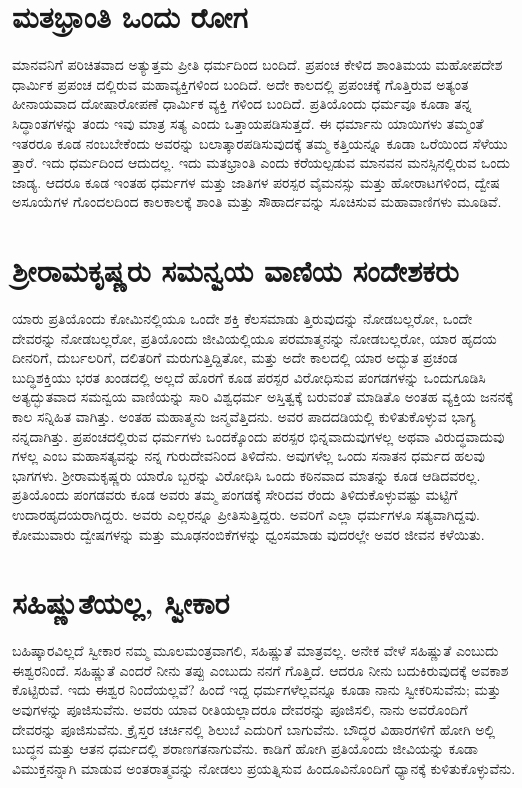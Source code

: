 \section{ಮತಭ್ರಾಂತಿ ಒಂದು ರೋಗ}

ಮಾನವನಿಗೆ ಪರಿಚಿತವಾದ ಅತ್ಯುತ್ತಮ ಪ್ರೀತಿ ಧರ್ಮದಿಂದ ಬಂದಿದೆ. ಪ್ರಪಂಚ ಕೇಳಿದ ಶಾಂತಿಮಯ ಮಹೋಪದೇಶ ಧಾರ್ಮಿಕ ಪ್ರಪಂಚ ದಲ್ಲಿರುವ ಮಹಾವ್ಯಕ್ತಿಗಳಿಂದ ಬಂದಿದೆ. ಅದೇ ಕಾಲದಲ್ಲಿ ಪ್ರಪಂಚಕ್ಕೆ ಗೊತ್ತಿರುವ ಅತ್ಯಂತ ಹೀನಾಯವಾದ ದೋಷಾರೋಪಣೆ ಧಾರ್ಮಿಕ ವ್ಯಕ್ತಿ ಗಳಿಂದ ಬಂದಿದೆ. ಪ್ರತಿಯೊಂದು ಧರ್ಮವೂ ಕೂಡಾ ತನ್ನ ಸಿದ್ಧಾಂತಗಳನ್ನು ತಂದು ಇವು ಮಾತ್ರ ಸತ್ಯ ಎಂದು ಒತ್ತಾಯಪಡಿಸುತ್ತದೆ. ಈ ಧರ್ಮಾನು ಯಾಯಿಗಳು ತಮ್ಮಂತೆ ಇತರರೂ ಕೂಡ ನಂಬಬೇಕೆಂದು ಅವರನ್ನು ಬಲಾತ್ಕಾರಪಡಿಸುವುದಕ್ಕೆ ತಮ್ಮ ಕತ್ತಿಯನ್ನೂ ಕೂಡಾ ಒರೆಯಿಂದ ಸೆಳೆಯು ತ್ತಾರೆ. ಇದು ಧರ್ಮದಿಂದ ಆದುದಲ್ಲ. ಇದು ಮತಭ್ರಾಂತಿ ಎಂದು ಕರೆಯಲ್ಪಡುವ ಮಾನವನ ಮನಸ್ಸಿನಲ್ಲಿರುವ ಒಂದು ಜಾಡ್ಯ. ಆದರೂ ಕೂಡ ಇಂತಹ ಧರ್ಮಗಳ ಮತ್ತು ಜಾತಿಗಳ ಪರಸ್ಪರ ವೈಮನಸ್ಸು ಮತ್ತು ಹೋರಾಟಗಳಿಂದ, ದ್ವೇಷ ಅಸೂಯೆಗಳ ಗೊಂದಲದಿಂದ ಕಾಲಕಾಲಕ್ಕೆ ಶಾಂತಿ ಮತ್ತು ಸೌಹಾರ್ದವನ್ನು ಸೂಚಿಸುವ ಮಹಾವಾಣಿಗಳು ಮೂಡಿವೆ.


\section{ಶ್ರೀರಾಮಕೃಷ್ಣರು ಸಮನ್ವಯ ವಾಣಿಯ ಸಂದೇಶಕರು}

ಯಾರು ಪ್ರತಿಯೊಂದು ಕೋಮಿನಲ್ಲಿಯೂ ಒಂದೇ ಶಕ್ತಿ ಕೆಲಸಮಾಡು ತ್ತಿರುವುದನ್ನು ನೋಡಬಲ್ಲರೋ, ಒಂದೇ ದೇವರನ್ನು ನೋಡಬಲ್ಲರೋ, ಪ್ರತಿಯೊಂದು ಜೀವಿಯಲ್ಲಿಯೂ ಪರಮಾತ್ಮನನ್ನು ನೋಡಬಲ್ಲರೋ, ಯಾರ ಹೃದಯ ದೀನರಿಗೆ, ದುರ್ಬಲರಿಗೆ, ದಲಿತರಿಗೆ ಮರುಗುತ್ತಿದ್ದಿತೋ, ಮತ್ತು ಅದೇ ಕಾಲದಲ್ಲಿ ಯಾರ ಅದ್ಭುತ ಪ್ರಚಂಡ ಬುದ್ಧಿಶಕ್ತಿಯು ಭರತ ಖಂಡದಲ್ಲಿ ಅಲ್ಲದೆ ಹೊರಗೆ ಕೂಡ ಪರಸ್ಪರ ವಿರೋಧಿಸುವ ಪಂಗಡಗಳನ್ನು ಒಂದುಗೂಡಿಸಿ ಅತ್ಯದ್ಭುತವಾದ ಸಮನ್ವಯ ವಾಣಿಯನ್ನು ಸಾರಿ ವಿಶ್ವಧರ್ಮ ಅಸ್ತಿತ್ವಕ್ಕೆ ಬರುವಂತೆ ಮಾಡಿತೊ ಅಂತಹ ವ್ಯಕ್ತಿಯ ಜನನಕ್ಕೆ ಕಾಲ ಸನ್ನಿಹಿತ ವಾಗಿತ್ತು. ಅಂತಹ ಮಹಾತ್ಮನು ಜನ್ಮವೆತ್ತಿದನು. ಅವರ ಪಾದದಡಿಯಲ್ಲಿ ಕುಳಿತುಕೊಳ್ಳುವ ಭಾಗ್ಯ ನನ್ನದಾಗಿತ್ತು. ಪ್ರಪಂಚದಲ್ಲಿರುವ ಧರ್ಮಗಳು ಒಂದಕ್ಕೊಂದು ಪರಸ್ಪರ ಭಿನ್ನವಾದುವುಗಳಲ್ಲ ಅಥವಾ ವಿರುದ್ಧವಾದುವು ಗಳಲ್ಲ ಎಂಬ ಮಹಾಸತ್ಯವನ್ನು ನನ್ನ ಗುರುದೇವನಿಂದ ತಿಳಿದೆನು. ಅವುಗಳೆಲ್ಲ ಒಂದು ಸನಾತನ ಧರ್ಮದ ಹಲವು ಭಾಗಗಳು. ಶ್ರೀರಾಮಕೃಷ್ಣರು ಯಾರೊ ಬ್ಬರನ್ನು ವಿರೋಧಿಸಿ ಒಂದು ಕಠಿನವಾದ ಮಾತನ್ನು ಕೂಡ ಆಡಿದವರಲ್ಲ. ಪ್ರತಿಯೊಂದು ಪಂಗಡವರು ಕೂಡ ಅವರು ತಮ್ಮ ಪಂಗಡಕ್ಕೆ ಸೇರಿದವ ರೆಂದು ತಿಳಿದುಕೊಳ್ಳುವಷ್ಟು ಮಟ್ಟಿಗೆ ಉದಾರಹೃದಯರಾಗಿದ್ದರು. ಅವರು ಎಲ್ಲರನ್ನೂ ಪ್ರೀತಿಸುತ್ತಿದ್ದರು. ಅವರಿಗೆ ಎಲ್ಲಾ ಧರ್ಮಗಳೂ ಸತ್ಯವಾಗಿದ್ದವು. ಕೋಮುವಾರು ದ್ವೇಷಗಳನ್ನು ಮತ್ತು ಮೂಢನಂಬಿಕೆಗಳನ್ನು ಧ್ವಂಸಮಾಡು ವುದರಲ್ಲೇ ಅವರ ಜೀವನ ಕಳೆಯಿತು.


\section{ಸಹಿಷ್ಣುತೆಯಲ್ಲ, ಸ್ವೀಕಾರ}

ಬಹಿಷ್ಕಾರವಿಲ್ಲದೆ ಸ್ವೀಕಾರ ನಮ್ಮ ಮೂಲಮಂತ್ರವಾಗಲಿ, ಸಹಿಷ್ಣುತೆ ಮಾತ್ರವಲ್ಲ. ಅನೇಕ ವೇಳೆ ಸಹಿಷ್ಣುತೆ ಎಂಬುದು ಈಶ್ವರನಿಂದೆ. ಸಹಿಷ್ಣುತೆ ಎಂದರೆ ನೀನು ತಪ್ಪು ಎಂಬುದು ನನಗೆ ಗೊತ್ತಿದೆ. ಆದರೂ ನೀನು ಬದುಕಿರುವುದಕ್ಕೆ ಅವಕಾಶ ಕೊಟ್ಟಿರುವೆ. ಇದು ಈಶ್ವರ ನಿಂದೆಯಲ್ಲವೆ? ಹಿಂದೆ ಇದ್ದ ಧರ್ಮಗಳೆಲ್ಲವನ್ನೂ ಕೂಡಾ ನಾನು ಸ್ವೀಕರಿಸುವೆನು; ಮತ್ತು ಅವುಗಳನ್ನು ಪೂಜಿಸುವೆನು. ಅವರು ಯಾವ ರೀತಿಯಲ್ಲಾದರೂ ದೇವರನ್ನು ಪೂಜಿಸಲಿ, ನಾನು ಅವರೊಂದಿಗೆ ದೇವರನ್ನು ಪೂಜಿಸುವೆನು. ಕ್ರೈಸ್ತರ ಚರ್ಚಿನಲ್ಲಿ ಶಿಲುಬೆ ಎದುರಿಗೆ ಬಾಗುವೆನು. ಬೌದ್ಧರ ವಿಹಾರಗಳಿಗೆ ಹೋಗಿ ಅಲ್ಲಿ ಬುದ್ಧನ ಮತ್ತು ಆತನ ಧರ್ಮದಲ್ಲಿ ಶರಾಣಗತನಾಗುವೆನು. ಕಾಡಿಗೆ ಹೋಗಿ ಪ್ರತಿಯೊಂದು ಜೀವಿಯನ್ನು ಕೂಡಾ ವಿಮುಕ್ತನನ್ನಾಗಿ ಮಾಡುವ ಅಂತರಾತ್ಮವನ್ನು ನೋಡಲು ಪ್ರಯತ್ನಿಸುವ ಹಿಂದೂವಿನೊಂದಿಗೆ ಧ್ಯಾನಕ್ಕೆ ಕುಳಿತುಕೊಳ್ಳುವೆನು.


